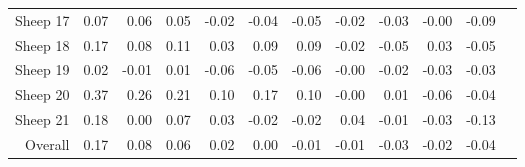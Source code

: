 \begin{table}[htp]
\begin{tabular}{rrrrrrrrrrrr}
Sheep  17   & 0.07 & 0.06 & 0.05 & -0.02 & -0.04 & -0.05 & -0.02 & -0.03 & -0.00 & -0.09 \\ 
Sheep  18   & 0.17 & 0.08 & 0.11 & 0.03 & 0.09 & 0.09 & -0.02 & -0.05 & 0.03 & -0.05 \\ 
Sheep  19   & 0.02 & -0.01 & 0.01 & -0.06 & -0.05 & -0.06 & -0.00 & -0.02 & -0.03 & -0.03 \\ 
Sheep  20   & 0.37 & 0.26 & 0.21 & 0.10 & 0.17 & 0.10 & -0.00 & 0.01 & -0.06 & -0.04 \\ 
Sheep  21   & 0.18 & 0.00 & 0.07 & 0.03 & -0.02 & -0.02 & 0.04 & -0.01 & -0.03 & -0.13 \\ 
   \hline
Overall &  0.17 & 0.08 & 0.06 & 0.02 & 0.00 & -0.01 & -0.01 & -0.03 & -0.02 & -0.04 \\ \hline
\end{tabular}
\end{table}
